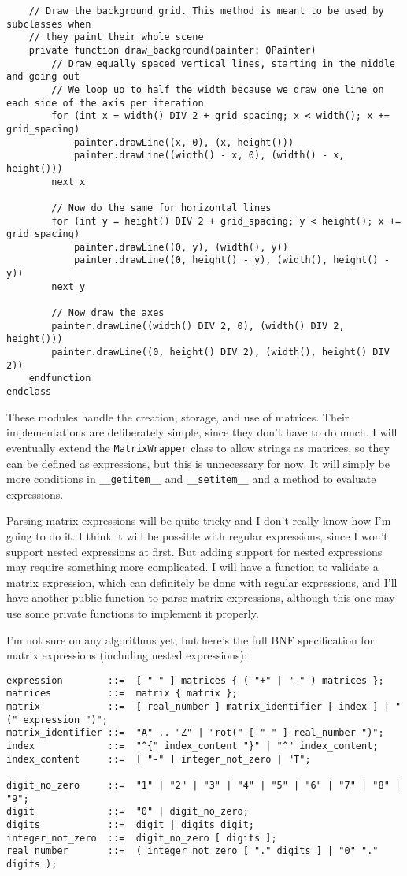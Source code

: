 \documentclass[../main.tex]{subfiles}
\begin{document}
\begin{verbatim}
	// Draw the background grid. This method is meant to be used by subclasses when
	// they paint their whole scene
	private function draw_background(painter: QPainter)
		// Draw equally spaced vertical lines, starting in the middle and going out
		// We loop uo to half the width because we draw one line on each side of the axis per iteration
		for (int x = width() DIV 2 + grid_spacing; x < width(); x += grid_spacing)
			painter.drawLine((x, 0), (x, height()))
			painter.drawLine((width() - x, 0), (width() - x, height()))
		next x

		// Now do the same for horizontal lines
		for (int y = height() DIV 2 + grid_spacing; y < height(); x += grid_spacing)
			painter.drawLine((0, y), (width(), y))
			painter.drawLine((0, height() - y), (width(), height() - y))
		next y

		// Now draw the axes
		painter.drawLine((width() DIV 2, 0), (width() DIV 2, height()))
		painter.drawLine((0, height() DIV 2), (width(), height() DIV 2))
	endfunction
endclass
\end{verbatim}

These modules handle the creation, storage, and use of matrices. Their implementations are deliberately simple, since they don't have to do much. I will eventually extend the \texttt{MatrixWrapper} class to allow strings as matrices, so they can be defined as expressions, but this is unnecessary for now. It will simply be more conditions in \texttt{\_\_getitem\_\_} and \texttt{\_\_setitem\_\_} and a method to evaluate expressions.

Parsing matrix expressions will be quite tricky and I don't really know how I'm going to do it. I think it will be possible with regular expressions, since I won't support nested expressions at first. But adding support for nested expressions may require something more complicated. I will have a function to validate a matrix expression, which can definitely be done with regular expressions, and I'll have another public function to parse matrix expressions, although this one may use some private functions to implement it properly.

I'm not sure on any algorithms yet, but here's the full BNF specification for matrix expressions (including nested expressions):

\begin{verbatim}
expression        ::=  [ "-" ] matrices { ( "+" | "-" ) matrices };
matrices          ::=  matrix { matrix };
matrix            ::=  [ real_number ] matrix_identifier [ index ] | "(" expression ")";
matrix_identifier ::=  "A" .. "Z" | "rot(" [ "-" ] real_number ")";
index             ::=  "^{" index_content "}" | "^" index_content;
index_content     ::=  [ "-" ] integer_not_zero | "T";

digit_no_zero     ::=  "1" | "2" | "3" | "4" | "5" | "6" | "7" | "8" | "9";
digit             ::=  "0" | digit_no_zero;
digits            ::=  digit | digits digit;
integer_not_zero  ::=  digit_no_zero [ digits ];
real_number       ::=  ( integer_not_zero [ "." digits ] | "0" "." digits );
\end{verbatim}
\end{document}
